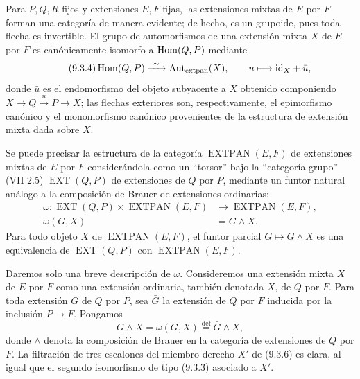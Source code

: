 
Para $P,Q,R$ fijos y extensiones $E,F$ fijas, las extensiones mixtas de
$E$ por $F$ forman una categoría de manera evidente; de hecho, es un
grupoide, pues toda flecha es invertible. El grupo de automorfismos de
una extensión mixta $X$ de $E$ por $F$ es canónicamente isomorfo a
$\operatorname{Hom}(Q,P)$ mediante
\begin{equation}\tag{9.3.4}
 \operatorname{Hom}(Q,P)
 \xrightarrow{\ \sim\ }
 \operatorname{Aut}_{\mathrm{extpan}}(X),
 \qquad
 u\longmapsto\mathrm{id}_X+\bar u,
\end{equation}
donde $\bar u$ es el endomorfismo del objeto subyacente a $X$ obtenido
componiendo
$X\longrightarrow Q\xrightarrow{u}P\longrightarrow X$; las flechas
exteriores son, respectivamente, el epimorfismo canónico y el
monomorfismo canónico provenientes de la estructura de extensión mixta
dada sobre $X$.

Se puede precisar la estructura de la categoría
$\operatorname{EXTPAN}(E,F)$ de extensiones mixtas de $E$ por $F$
considerándola como un ``torsor'' bajo la ``categoría-grupo'' (VII 2.5)
$\operatorname{EXT}(Q,P)$ de extensiones de $Q$ por $P$, mediante un
funtor natural análogo a la composición de Brauer de extensiones
ordinarias:
\begin{equation}\tag{9.3.5}
\begin{aligned}
 \omega:
 \operatorname{EXT}(Q,P)\times\operatorname{EXTPAN}(E,F)
 &\longrightarrow\operatorname{EXTPAN}(E,F),\\
 \omega(G,X)&=G\wedge X.
\end{aligned}
\end{equation}
Para todo objeto $X$ de $\operatorname{EXTPAN}(E,F)$, el funtor
parcial $G\longmapsto G\wedge X$ es una equivalencia de
$\operatorname{EXT}(Q,P)$ con $\operatorname{EXTPAN}(E,F)$.


Daremos solo una breve descripción de $\omega$. Consideremos una
extensión mixta $X$ de $E$ por $F$ como una extensión ordinaria, también
denotada $X$, de $Q$ por $F$. Para toda extensión $G$ de $Q$ por $P$,
sea $\bar G$ la extensión de $Q$ por $F$ inducida por la inclusión
$P\longrightarrow F$. Pongamos
\begin{equation}\tag{9.3.6}
 G\wedge X=\omega(G,X)
 \overset{\mathrm{def}}{=}\bar G\wedge X,
\end{equation}
donde $\wedge$ denota la composición de Brauer en la categoría de
extensiones de $Q$ por $F$. La filtración de tres escalones del miembro
derecho $X'$ de (9.3.6) es clara, al igual que el segundo isomorfismo de
tipo (9.3.3) asociado a $X'$.


